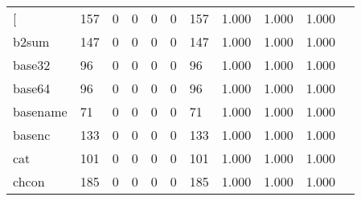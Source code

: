 \begin{longtable}{lp{1.10cm}p{1.10cm}p{1.10cm}p{1.10cm}p{1.10cm}p{1.10cm}p{1.10cm}p{1.10cm}p{1.10cm}p{1.10cm}}
\bottomrule
\endlastfoot
{[}         &                    157 &                                  0 &                                 0 &                                0 &                                 0 &                             157 &                          1.000 &                                 1.000 &                               1.000 \\
b2sum     &                    147 &                                  0 &                                 0 &                                0 &                                 0 &                             147 &                          1.000 &                                 1.000 &                               1.000 \\
base32    &                     96 &                                  0 &                                 0 &                                0 &                                 0 &                              96 &                          1.000 &                                 1.000 &                               1.000 \\
base64    &                     96 &                                  0 &                                 0 &                                0 &                                 0 &                              96 &                          1.000 &                                 1.000 &                               1.000 \\
basename  &                     71 &                                  0 &                                 0 &                                0 &                                 0 &                              71 &                          1.000 &                                 1.000 &                               1.000 \\
basenc    &                    133 &                                  0 &                                 0 &                                0 &                                 0 &                             133 &                          1.000 &                                 1.000 &                               1.000 \\
cat       &                    101 &                                  0 &                                 0 &                                0 &                                 0 &                             101 &                          1.000 &                                 1.000 &                               1.000 \\
chcon     &                    185 &                                  0 &                                 0 &                                0 &                                 0 &                             185 &                          1.000 &                                 1.000 &                               1.000 \\

\end{longtable}
